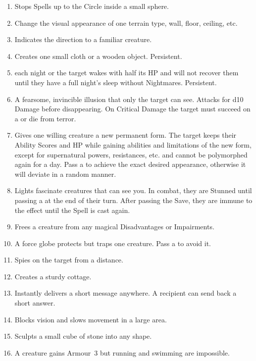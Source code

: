 \documentclass[itdr]{subfiles}
\begin{document}
\begin{enumerate}
	\item {} Stops Spells up to the  Circle inside a small sphere.
	\item {} Change the visual appearance of one terrain type, wall, floor, ceiling, etc.
	\item {} Indicates the direction to a familiar creature.
	\item {} Creates one small cloth or a wooden object. Persistent.
	\item {}  each night or the target wakes with half its HP and will not recover them until they have a full night's sleep without Nightmares. Persistent.
	\item {} A fearsome, invincible illusion that only the target can see. Attacks for d10 Damage before disappearing. On Critical Damage the target must succeed on a  or die from terror.
	\item {} Gives one willing creature a new permanent form. The target keeps their Ability Scores and HP while gaining abilities and limitations of the new form, except for supernatural powers, resistances, etc. and cannot be polymorphed again for a day. Pass a  to achieve the exact desired appearance, otherwise it will deviate in a random manner.
	\item {} Lights fascinate creatures that can see you. In combat, they are Stunned until passing a  at the end of their turn. After passing the Save, they are immune to the effect until the Spell is cast again.
	\item {} Frees a creature from any magical Disadvantages or Impairments.
	\item {} A force globe protects but traps one creature. Pass a  to avoid it.
	\item {} Spies on the target from a distance.
	\item {} Creates a sturdy cottage.
	\item {} Instantly delivers a short message anywhere. A recipient can send back a short \mbox{answer}.
	\item {} Blocks vision and slows movement in a large area.
	\item {} Sculpts a small cube of stone into any shape.
	\item {} A creature gains Armour~3 but running and swimming are impossible.

\end{enumerate}
\end{document}
